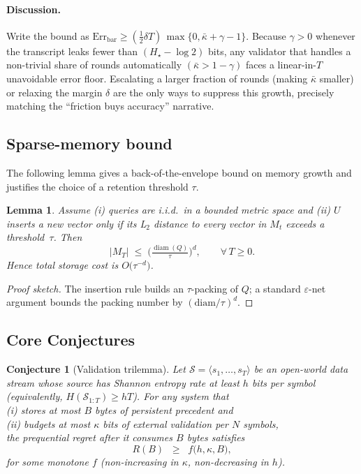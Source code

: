 \documentclass[11pt]{article}
\newcommand{\Err}{\mathrm{Err}}
\newtheorem{lemma}{Lemma}
\begin{document}
\paragraph{Discussion.}
Write the bound as  
\(\Err_{\mathrm{bar}}\!\ge(\tfrac12\delta T)\,\max\{0,\bar\kappa+\gamma-1\}\).
Because \(\gamma>0\) whenever the transcript leaks
fewer than \((H_{\star}-\log 2)\) bits, any validator that
handles a non-trivial share of rounds automatically
\((\bar\kappa>1-\gamma)\)
faces a linear-in-$T$ unavoidable error floor.
Escalating a larger fraction of rounds (making $\bar\kappa$ smaller) or
relaxing the margin $\delta$ are the only ways to suppress this growth,
precisely matching the “friction buys accuracy” narrative.






\subsection{Sparse-memory bound}
\label{sec:sparse-memory-bound}

The following lemma gives a back-of-the-envelope bound on memory growth and justifies the choice of a retention threshold $\tau$.

\begin{lemma}
\label{lemma}
Assume (i) queries are i.i.d.\ in a bounded metric space
and (ii)  $U$ inserts a new vector only if its L$_2$ distance to every
vector in $M_t$ exceeds a threshold~$\tau$.  Then
\[
  |M_T| \;\le\;
  \bigl(\tfrac{\operatorname{diam}(Q)}{\tau}\bigr)^{d},
  \qquad
  \forall\,T\ge 0 .
\]
Hence total storage cost is $O\!\bigl(\tau^{-d}\bigr)$.
\end{lemma}

\begin{proof}[Proof sketch]
The insertion rule builds an $\tau$-packing of $Q$; a standard $\varepsilon$-net
argument bounds the packing number by $(\mathrm{diam}/\tau)^d$.
\end{proof}

\subsection{Core Conjectures}
\label{sec:conjectures}

\newtheorem{conjecture}{Conjecture}
\begin{conjecture}[Validation trilemma]\label{conjecture1}
Let $\mathcal{S}=\langle s_1,\dots,s_T\rangle$ be an open-world data stream
whose source has Shannon entropy rate at least $h$ bits per symbol
(equivalently, $H(\mathcal S_{1:T})\ge hT$).
For any system that\\[0.1em]
\hspace*{1.5em}(i) stores at most $B$ bytes of persistent precedent and\\[0em]
\hspace*{1.5em}(ii) budgets at most $\kappa$ bits of external validation per $N$ symbols,\\
the prequential regret after it consumes $B$ bytes satisfies
\[
   R(B)\;\;\ge\;\;f\bigl(h,\kappa,B\bigr),
\]
for some monotone $f$ (non-increasing in $\kappa$, non-decreasing in $h$).
\end{conjecture}
\end{document}
